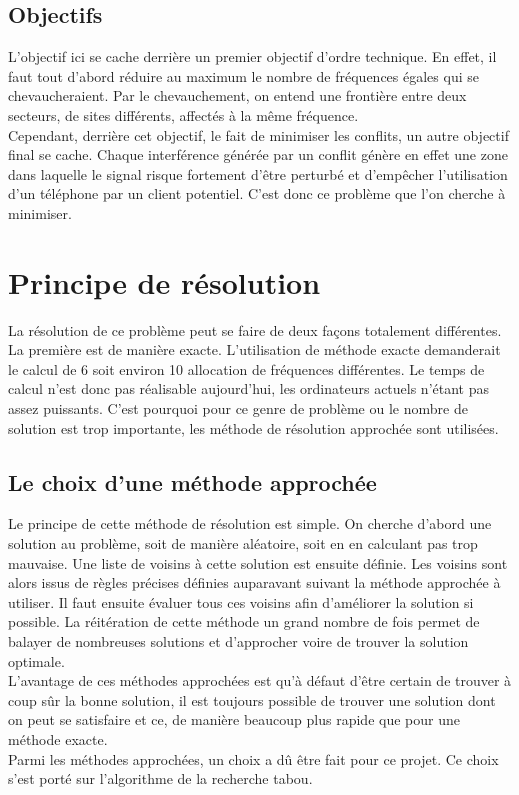 \documentclass[a4paper, 11pt]{report}
\begin{document}
	\section{Objectifs}

	L'objectif ici se cache derrière un premier objectif d'ordre technique. En effet, il faut tout d'abord réduire au maximum le nombre de fréquences égales qui se chevaucheraient. Par le chevauchement, on entend une frontière entre deux secteurs, de sites différents, affectés à la même fréquence.\\
	Cependant, derrière cet objectif, le fait de minimiser les conflits, un autre objectif final se cache. Chaque interférence générée par un conflit génère en effet une zone dans laquelle le signal risque fortement d'\^etre perturbé et d’empêcher l'utilisation d'un téléphone par un client potentiel. C'est donc ce problème que l'on cherche à minimiser.


\chapter{Principe de résolution}
	
	La résolution de ce problème peut se faire de deux façons totalement différentes. La première est de manière exacte. L'utilisation de méthode exacte demanderait le calcul de 6 soit environ 10 allocation de fréquences différentes. Le temps de calcul n'est donc pas réalisable aujourd'hui, les ordinateurs actuels n'étant pas assez puissants. C'est pourquoi pour ce genre de problème ou le nombre de solution est trop importante, les méthode de résolution approchée sont utilisées.

		\section{Le choix d'une méthode approchée}
		Le principe de cette méthode de résolution est simple. On cherche d'abord une solution au problème, soit de manière aléatoire, soit en en calculant pas trop mauvaise.
		Une liste de voisins à cette solution est ensuite définie. Les voisins sont alors issus de règles précises définies auparavant suivant la méthode approchée à utiliser.
		Il faut ensuite évaluer tous ces voisins afin d'améliorer la solution si possible. La réitération de cette méthode un grand nombre de fois permet de balayer de nombreuses solutions et d'approcher voire de trouver la solution optimale.\\
		L'avantage de ces méthodes approchées est qu'à défaut d'être certain de trouver à coup sûr la bonne solution, il est toujours possible de trouver une solution dont on peut se satisfaire et ce, de manière beaucoup plus rapide que pour une méthode exacte.\\
		Parmi les méthodes approchées, un choix a dû être fait pour ce projet. Ce choix s'est porté sur l'algorithme de la recherche tabou.
\end{document}
